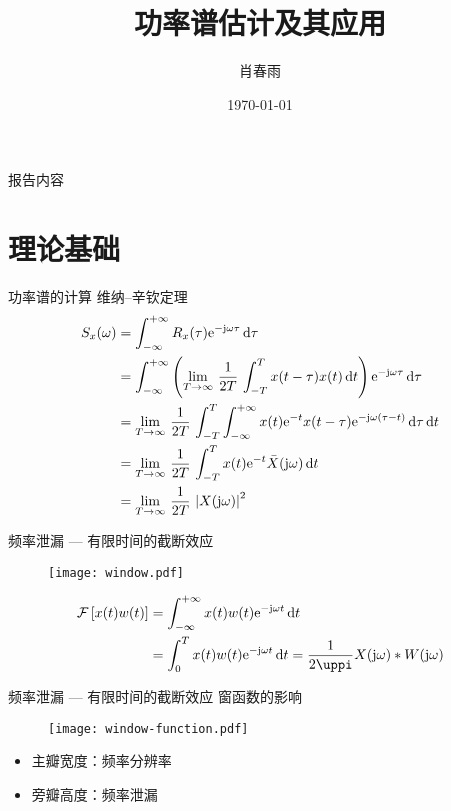 \documentclass{beamer}
\title{功率谱估计及其应用}
\date{\today}
\author{肖春雨}
\institute{华中科技大学}
\begin{document}
\maketitle

\begin{frame}{报告内容}
    \tableofcontents
\end{frame}

\section{理论基础}
\begin{frame}{功率谱的计算}
    维纳--辛钦定理
    \begin{align*}
        S_x(\omega) &= \int_{-\infty}^{+\infty} R_x(\tau) \mathrm{e}^{-\mathrm{j}\omega\tau} \mathop{}\!\mathrm{d} \tau \\
        &= \int_{-\infty}^{+\infty} \left( \lim_{T \to \infty} \, \frac{1}{2T} \, \int_{-T}^{T} x(t-\tau)x(t) \mathop{}\!\mathrm{d} t   \right) \mathrm{e}^{-\mathrm{j}\omega\tau} \mathop{}\!\mathrm{d} \tau  \\
        &= \lim_{T \to \infty} \, \frac{1}{2T} \, \int_{-T}^{T} \int_{-\infty}^{+\infty} x(t)\mathrm{e}^{-t} x(t-\tau)\mathrm{e}^{-\mathrm{j}\omega(\tau-t)} \mathop{}\!\mathrm{d} \tau \mathop{}\!\mathrm{d} t \\
        &= \lim_{T \to \infty} \, \frac{1}{2T} \, \int_{-T}^{T}  x(t)\mathrm{e}^{-t} \bar{X}(\mathrm{j}\omega) \mathop{}\!\mathrm{d} t \\
        &= \lim_{T \to \infty} \, \frac{1}{2T} \, \left| X(\mathrm{j}\omega) \right|^2
    \end{align*}
\end{frame}


\begin{frame}{频率泄漏 --- 有限时间的截断效应}
    \begin{figure}
        \centering
        \texttt{[image: window.pdf]}
    \end{figure}
    \begin{align*}
        \mathcal{F}\left[x(t)w(t)\right] &= \int_{-\infty}^{+\infty} x(t)w(t) \e{-\j\omega t} \dif t \\
        &= \int_{0}^{T} x(t)w(t) \e{-\j\omega t} \dif t 
        = \frac{1}{2\uppi} X(\j\omega) \ast W(\j\omega)
    \end{align*}
\end{frame}

\begin{frame}{频率泄漏 --- 有限时间的截断效应}
    窗函数的影响
    \begin{figure}
        \centering
        \texttt{[image: window-function.pdf]}
    \end{figure}
    \begin{itemize}
        \item 主瓣宽度：频率分辨率
        \item 旁瓣高度：频率泄漏
    \end{itemize}
\end{frame}
\end{document}

